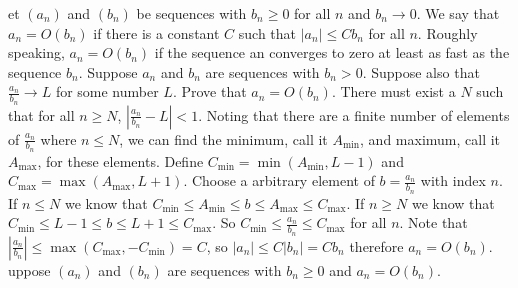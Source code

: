 \documentclass[12pt]{article}
\makeatletter
\theoremstyle{homework}
\newenvironment{exercise}[1]
{\def\@currentlabel{#1}\exercisecore}
{\endexercisecore}
\makeatother
\begin{document}
\begin{exercise}

Let $(a_n)$ and $(b_n)$ be sequences with $b_n \geq 0$ for all $n$ and $b_n\rightarrow 0$. We say that $a_n = O(b_n)$ if there is a constant $C$ such that $|a_n| \leq Cb_n$ for all $n$.  Roughly speaking, $a_n = O(b_n)$ if the sequence an converges to zero at least as fast as the sequence $b_n$.  Suppose $a_n$ and $b_n$ are sequences with $b_n > 0$. Suppose also that $\frac{a_n}{b_n}\rightarrow L$ for some number $L$. Prove that $a_n = O(b_n)$.
\end{exercise}
There must exist a $N$ such that for all $n\geq N$, $|\frac{a_n}{b_n}-L|<1$.  Noting that there are a finite number of elements of $\frac{a_n}{b_n}$ where $n\leq N$, we can find the minimum, call it $A_{\min}$, and maximum, call it $A_{\max}$, for these elements.  Define $C_{\min}=\min(A_{\min},L-1)$ and $C_{\max}=\max(A_{\max},L+1)$.  Choose a arbitrary element of $b=\frac{a_n}{b_n}$ with index $n$.  If $n\leq N$ we know that $C_{\min} \leq A_{\min}\leq b\leq A_{\max}\leq C_{\max}$.  If $n\geq N$ we know that $C_{\min} \leq L-1 \leq b\leq L+1 \leq C_{\max}$.  So $C_{\min} \leq \frac{a_n}{b_n} \leq C_{\max}$ for all $n$.  Note that $|\frac{a_n}{b_n}| \leq \max(C_{\max},-C_{\min})=C$, so $|a_n|\leq C|b_n|=Cb_n$ therefore $a_n = O(b_n)$.
\begin{exercise}

Suppose $(a_n)$ and $(b_n)$ are sequences with $b_n \geq 0$ and $a_n = O(b_n)$.
\end{exercise}
\end{document}
